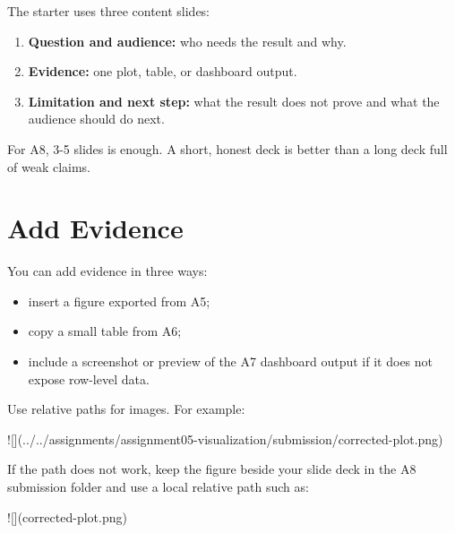 \documentclass[
  letterpaper,
  DIV=11,
  numbers=noendperiod,
  oneside]{scrreprt}
\newenvironment{Shaded}{\begin{snugshade}}{\end{snugshade}}
\newcommand{\AlertTok}[1]{\textcolor[rgb]{0.68,0.00,0.00}{#1}}
\providecommand{\tightlist}{%
  \setlength{\itemsep}{0pt}\setlength{\parskip}{0pt}}
\begin{document}

The starter uses three content slides:

\begin{enumerate}
\def\labelenumi{\arabic{enumi}.}
\tightlist
\item
  \textbf{Question and audience:} who needs the result and why.
\item
  \textbf{Evidence:} one plot, table, or dashboard output.
\item
  \textbf{Limitation and next step:} what the result does not prove and
  what the audience should do next.
\end{enumerate}

For A8, 3-5 slides is enough. A short, honest deck is better than a long
deck full of weak claims.

\section*{Add Evidence}\label{add-evidence}


You can add evidence in three ways:

\begin{itemize}
\tightlist
\item
  insert a figure exported from A5;
\item
  copy a small table from A6;
\item
  include a screenshot or preview of the A7 dashboard output if it does
  not expose row-level data.
\end{itemize}

Use relative paths for images. For example:

\begin{Shaded}
\begin{Highlighting}[numbers=left,,]
\AlertTok{![](../../assignments/assignment05{-}visualization/submission/corrected{-}plot.png)}
\end{Highlighting}
\end{Shaded}

If the path does not work, keep the figure beside your slide deck in the
A8 submission folder and use a local relative path such as:

\begin{Shaded}
\begin{Highlighting}[numbers=left,,]
\AlertTok{![](corrected{-}plot.png)}
\end{Highlighting}
\end{Shaded}
\end{document}
